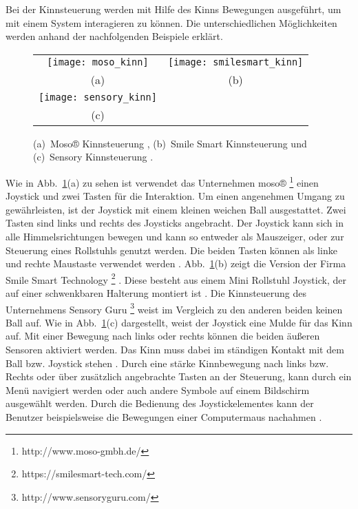 Bei der Kinnsteuerung werden mit Hilfe des Kinns Bewegungen ausgeführt, um mit einem System interagieren zu können. Die unterschiedlichen Möglichkeiten werden anhand der nachfolgenden Beispiele erklärt.
%
\begin{figure}
\centering\small
\setlength{\tabcolsep}{0mm}	%
\begin{tabular}{c@{\hspace{15mm}}c} %
  \texttt{[image: moso\_kinn]} &
  \texttt{[image: smilesmart\_kinn]}
\\
  (a) & (b)
\\[5pt]	%
  \texttt{[image: sensory\_kinn]}
\\
  (c)
\end{tabular}
%
\caption{(a)~Moso® Kinnsteuerung \cite{MOSO}, (b)~Smile Smart Kinnsteuerung \cite{SMILESMART} und (c)~Sensory Kinnsteuerung \cite{SENSORY}.}
\label{fig:kinn}
\end{figure}
\newline \newline
Wie in Abb.~\ref{fig:kinn}(a) zu sehen ist verwendet das Unternehmen moso® %
\footnote{http://www.moso-gmbh.de/}
%
einen Joystick und zwei Tasten für die Interaktion. Um einen angenehmen Umgang zu gewährleisten, ist der Joystick mit einem kleinen weichen Ball ausgestattet. Zwei Tasten sind links und rechts des Joysticks angebracht. Der Joystick kann sich in alle Himmelsrichtungen bewegen und kann so entweder als Mauszeiger, oder zur Steuerung eines Rollstuhls genutzt werden. Die beiden Tasten können als linke und rechte Maustaste verwendet werden \cite{MOSO}.
\newline
Abb.~\ref{fig:kinn}(b) zeigt die Version der Firma Smile Smart Technology %
\footnote{https://smilesmart-tech.com/}
%
. Diese besteht aus einem Mini Rollstuhl Joystick, der auf einer schwenkbaren Halterung montiert ist \cite{SMILESMART}.
\newline
Die Kinnsteuerung des Unternehmens Sensory Guru %
\footnote{http://www.sensoryguru.com/}
%
weist im Vergleich zu den anderen beiden keinen Ball auf. Wie in Abb.~\ref{fig:kinn}(c) dargestellt, weist der Joystick eine Mulde für das Kinn auf. Mit einer Bewegung nach links oder rechts können die beiden äußeren Sensoren aktiviert werden. Das Kinn muss dabei im ständigen Kontakt mit dem Ball bzw. Joystick stehen \cite{SENSORY}. 
\newline
Durch eine stärke Kinnbewegung nach links bzw. Rechts oder über zusätzlich angebrachte Tasten an der Steuerung, kann durch ein Menü navigiert werden oder auch andere Symbole auf einem Bildschirm ausgewählt werden. Durch die Bedienung des Joystickelementes kann der Benutzer beispielsweise die Bewegungen einer Computermaus nachahmen \cite{MOSO} \cite{SENSORY}. 
